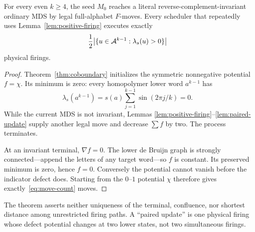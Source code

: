 \begin{theorem}
\label{thm:even-descent}
For every even $k\geq4$, the seed $M_0$ reaches a literal
reverse-complement-invariant ordinary MDS by legal full-alphabet $F$-moves.
Every scheduler that repeatedly uses Lemma~\ref{lem:positive-firing} executes
exactly
\begin{equation}
  \frac12\bigl|\{u\in\mathcal A^{k-1}:\lambda_s(u)>0\}\bigr|
  \label{eq:move-count}
\end{equation}
physical firings.
\end{theorem}

\begin{proof}
Theorem~\ref{thm:coboundary} initializes the symmetric nonnegative potential
$f=\chi$.  Its minimum is zero: every homopolymer lower word $a^{k-1}$ has
\[
  \lambda_s(a^{k-1})
  =s(a)\sum_{j=1}^{k-1}\sin(2\pi j/k)=0.
\]
While the current MDS is not invariant, Lemmas
\ref{lem:positive-firing}--\ref{lem:paired-update} supply another legal move
and decrease $\sum f$ by two.  The process terminates.

At an invariant terminal, $\nabla f=0$.  The lower de Bruijn graph is
strongly connected---append the letters of any target word---so $f$ is
constant.  Its preserved minimum is zero, hence $f=0$.  Conversely the
potential cannot vanish before the indicator defect does.  Starting from the
$0$--$1$ potential $\chi$ therefore gives exactly~\eqref{eq:move-count}
moves.
\end{proof}

The theorem asserts neither uniqueness of the terminal, confluence, nor
shortest distance among unrestricted firing paths.  A ``paired update'' is
one physical firing whose defect potential changes at two lower states, not
two simultaneous firings.
